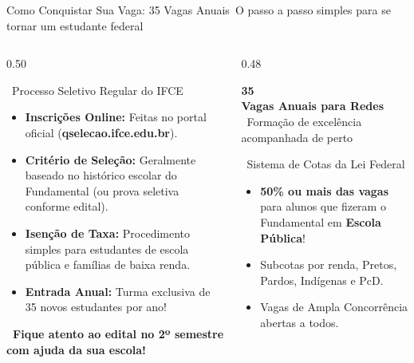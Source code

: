 \begin{frame}{Como Conquistar Sua Vaga: 35 Vagas Anuais}{\faDoorOpen\ O passo a passo simples para se tornar um estudante federal}
  \begin{columns}[t]
    \begin{column}{0.50\textwidth}
      \begin{greencard}{\faGraduationCap\ Processo Seletivo Regular do IFCE}
        \tiny
        \begin{itemize}\setlength{\itemsep}{0.18em}
          \item \textbf{Inscrições Online:} Feitas no portal oficial (\textbf{qselecao.ifce.edu.br}).
          \item \textbf{Critério de Seleção:} Geralmente baseado no histórico escolar do Fundamental (ou prova seletiva conforme edital).
          \item \textbf{Isenção de Taxa:} Procedimento simples para estudantes de escola pública e famílias de baixa renda.
          \item \textbf{Entrada Anual:} Turma exclusiva de 35 novos estudantes por ano!
        \end{itemize}
      \end{greencard}
      \vspace{0.06cm}
      \begin{center}
        \tiny \textcolor{IFCEDarkGreen}{\textbf{\faBullhorn\ Fique atento ao edital no 2º semestre com ajuda da sua escola!}}
      \end{center}
    \end{column}
    
    \begin{column}{0.48\textwidth}
      \begin{statcard}
        \LARGE \textcolor{IFCEDarkGreen}{\textbf{35}} \\
        \scriptsize \textbf{Vagas Anuais para Redes} \\
        \tiny \textcolor{IFCERed}{\faUsers\ Formação de excelência acompanhada de perto}
      \end{statcard}
      \vspace{0.06cm}
      \begin{bluecard}{\faBalanceScale\ Sistema de Cotas da Lei Federal}
        \tiny
        \begin{itemize}\setlength{\itemsep}{0.12em}
          \item \textbf{50\% ou mais das vagas} para alunos que fizeram o Fundamental em \textbf{Escola Pública}!
          \item Subcotas por renda, Pretos, Pardos, Indígenas e PcD.
          \item Vagas de Ampla Concorrência abertas a todos.
        \end{itemize}
      \end{bluecard}
    \end{column}
  \end{columns}
\end{frame}

